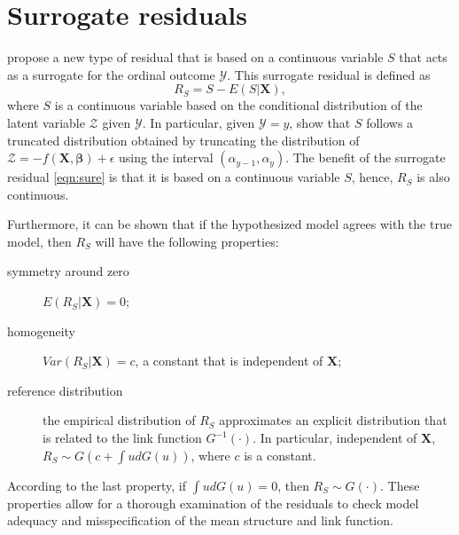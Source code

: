 \section{Surrogate residuals}
\label{sec:surrogate}

\citet{residuals-liu-2017} propose a new type of residual that is based on a continuous variable $S$ that acts as a surrogate for the ordinal outcome $\mathcal{Y}$. This surrogate residual is defined as
\begin{equation}
\label{eqn:sure}
R_S = S - E\left(S | \boldsymbol{X}\right),
\end{equation}
where $S$ is a continuous variable based on the conditional distribution of the latent variable $\mathcal{Z}$ given $\mathcal{Y}$. In particular, given $\mathcal{Y} = y$, \citet{residuals-liu-2017} show that $S$ follows a truncated distribution obtained by truncating the distribution of $\mathcal{Z} = -f\left(\boldsymbol{X}, \boldsymbol{\beta}\right) + \epsilon$ using the interval $\left(\alpha_{y - 1}, \alpha_y\right)$. The benefit of the surrogate residual \eqref{eqn:sure} is that it is based on a continuous variable $S$, hence, $R_S$ is also continuous. 

Furthermore, it can be shown \citep{residuals-liu-2017} that if the hypothesized model agrees with the true model, then $R_S$ will have the following properties:
\begin{description}
  \item[symmetry around zero] $E\left(R_S | \boldsymbol{X}\right) = 0$;
  \item[homogeneity] $Var\left(R_S | \boldsymbol{X}\right) = c$, a constant that is independent of $\boldsymbol{X}$;
  \item[reference distribution] the empirical distribution of $R_S$ approximates an explicit distribution that is related to the link function $G^{-1}\left(\cdot\right)$. In particular, independent of $\boldsymbol{X}$, $R_S \sim G\left(c + \int udG(u)\right)$, where $c$ is a constant.
\end{description}
According to the last property, if $\int u dG\left(u\right) = 0$, then $R_S \sim G\left(\cdot\right)$. These properties allow for a thorough examination of the residuals to check model adequacy and misspecification of the mean structure and link function.


